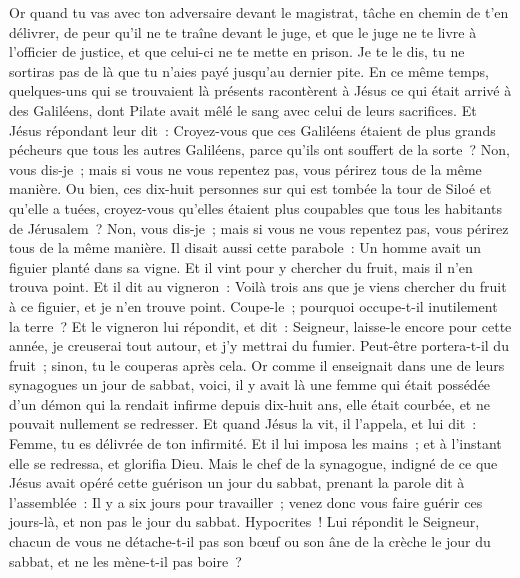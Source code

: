 \begin{multicols}{2}
Or quand tu vas avec ton adversaire devant le magistrat, tâche en chemin de t'en délivrer, de peur qu'il ne te traîne devant le juge, et que le juge ne te livre à l'officier de justice, et que celui-ci ne te mette en prison.
Je te le dis, tu ne sortiras pas de là que tu n'aies payé jusqu'au dernier pite.
\VerseOne{}En ce même temps, quelques-uns qui se trouvaient là présents racontèrent à Jésus ce qui était arrivé à des Galiléens, dont Pilate avait mêlé le sang avec celui de leurs sacrifices.
Et Jésus répondant leur dit~: Croyez-vous que ces Galiléens étaient de plus grands pécheurs que tous les autres Galiléens, parce qu'ils ont souffert de la sorte~?
Non, vous dis-je~; mais si vous ne vous repentez pas, vous périrez tous de la même manière.
Ou bien, ces dix-huit personnes sur qui est tombée la tour de Siloé et qu'elle a tuées, croyez-vous qu'elles étaient plus coupables que tous les habitants de Jérusalem~?
Non, vous dis-je~; mais si vous ne vous repentez pas, vous périrez tous de la même manière.
Il disait aussi cette parabole~: Un homme avait un figuier planté dans sa vigne. Et il vint pour y chercher du fruit, mais il n'en trouva point.
Et il dit au vigneron~: Voilà trois ans que je viens chercher du fruit à ce figuier, et je n'en trouve point. Coupe-le~; pourquoi occupe-t-il inutilement la terre~?
Et le vigneron lui répondit, et dit~: Seigneur, laisse-le encore pour cette année, je creuserai tout autour, et j'y mettrai du fumier.
Peut-être portera-t-il du fruit~; sinon, tu le couperas après cela.
Or comme il enseignait dans une de leurs synagogues un jour de sabbat,
voici, il y avait là une femme qui était possédée d'un démon qui la rendait infirme depuis dix-huit ans, elle était courbée, et ne pouvait nullement se redresser.
Et quand Jésus la vit, il l'appela, et lui dit~: Femme, tu es délivrée de ton infirmité.
Et il lui imposa les mains~; et à l'instant elle se redressa, et glorifia Dieu.
Mais le chef de la synagogue, indigné de ce que Jésus avait opéré cette guérison un jour du sabbat, prenant la parole dit à l'assemblée~: Il y a six jours pour travailler~; venez donc vous faire guérir ces jours-là, et non pas le jour du sabbat.
Hypocrites~! Lui répondit le Seigneur, chacun de vous ne détache-t-il pas son bœuf ou son âne de la crèche le jour du sabbat, et ne les mène-t-il pas boire~?

\end{multicols}
